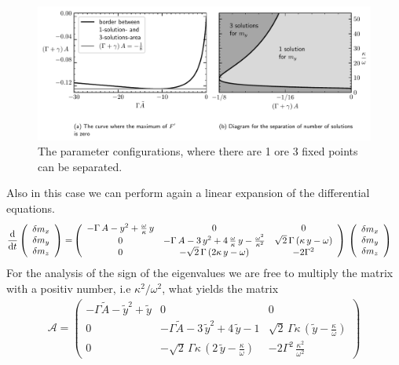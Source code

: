 \documentclass{article}
\begin{document}
\begin{figure}[H]
    \hspace*{-1cm}
    \includegraphics{pictures/phaseplot_A_kw.pdf}
    \caption{The parameter configurations, where there are 1 ore 3 fixed points can be separated.}
    \label{fig:phases_numb_of_fixp}
\end{figure}
Also in this case we can perform again a linear expansion of the differential equations.
\begin{align*}
    \frac{\text{d}}{\text{d}t}\left(\begin{array}{c}
         \delta m_x\\
         \delta m_y\\
         \delta m_z
    \end{array}\right)=&\left( \begin{array}{ccc}
        -\Gamma\,A-y^2+\frac{\omega}{\kappa}\,y&  0 & 0\\
        0 & -\Gamma\,A-3\,y^2+4\,\frac{\omega}{\kappa}\,y-\frac{\omega^2}{\kappa^2} & \sqrt{2}\,\Gamma\,(\kappa\,y-\omega)\\
        0 &  -\sqrt{2}\,\Gamma\,(2\kappa\,y-\omega) & -2\Gamma^2
    \end{array} \right)\,\left(\begin{array}{c}
         \delta m_x\\
         \delta m_y\\
         \delta m_z
    \end{array}\right)
\end{align*}
For the analysis of the sign of the eigenvalues we are free to multiply the matrix with a positiv number, i.e $\kappa^2/\omega^2$, what yields the matrix
\begin{align*}
    \mathcal{A}=\left( \begin{array}{ccc}
        -\Gamma\tilde{A}-\tilde{y}^2+\tilde{y}&  0 & 0\\
        0 & -\Gamma\tilde{A}-3\,\tilde{y}^2+4\,\tilde{y}-1 & \sqrt{2}\,\Gamma\kappa\,(\tilde{y}-\frac{\kappa}{\omega})\\
        0 &  -\sqrt{2}\,\Gamma\kappa\,(2\,\tilde{y}-\frac{\kappa}{\omega}) & -2\Gamma^2\,\frac{\kappa^2}{\omega^2}
    \end{array} \right)
\end{align*}
\end{document}
